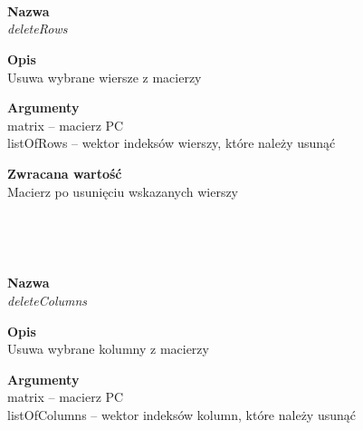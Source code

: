 \begin{spacing}{1.1}
\begin{spacing}{1.1}
\begin{spacing}{1.1}
\begin{spacing}{1.2}
\begin{spacing}{1.1}
\begin{spacing}{1.2}
\begin{spacing}{1.2}
\begin{spacing}{1.2}
\\~\\ 
\begin{spacing}{1.2}
 \\ \begin{spacing}{0.5}  \end{spacing}

\textbf{Nazwa}\\  \emph{deleteRows} \\ \begin{spacing}{0.3}  \end{spacing}
 
\textbf{Opis}\\ Usuwa wybrane wiersze z macierzy \\  \begin{spacing}{0.3}  \end{spacing}
 
\textbf{Argumenty} \\
matrix -- macierz PC \\ 
listOfRows -- wektor indeksów wierszy, które należy usunąć \\ \begin{spacing}{0.3}  \end{spacing}

\textbf{Zwracana wartość}\\ Macierz po usunięciu wskazanych wierszy \\ \begin{spacing}{0.3}  \end{spacing}\\


\newpage
\begin{spacing}{1.2}
 \\ \begin{spacing}{0.5}  \end{spacing}

\textbf{Nazwa}\\  \emph{deleteColumns} \\ \begin{spacing}{0.3}  \end{spacing}
 
\textbf{Opis}\\ Usuwa wybrane kolumny z macierzy \\  \begin{spacing}{0.3}  \end{spacing}
 
\textbf{Argumenty} \\
matrix -- macierz PC \\ 
listOfColumns -- wektor indeksów kolumn, które należy usunąć \\ \begin{spacing}{0.3}  \end{spacing}


\end{spacing}
\end{spacing}
\end{spacing}
\end{spacing}
\end{spacing}
\end{spacing}
\end{spacing}
\end{spacing}
\end{spacing}
\end{spacing}
